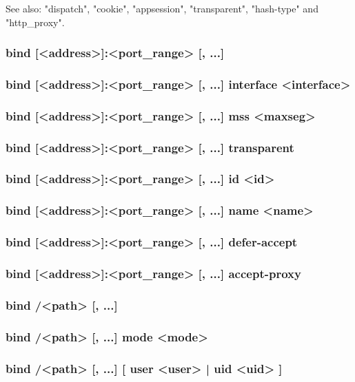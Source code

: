   See also: "dispatch", "cookie", "appsession", "transparent", "hash-type" and
             "http\_proxy".

\subsubsection[bind]{bind [<address>]:<port\_range> [, ...]}
\subsubsection*{bind [<address>]:<port\_range> [, ...] interface <interface>}
\subsubsection*{bind [<address>]:<port\_range> [, ...] mss <maxseg>}
\subsubsection*{bind [<address>]:<port\_range> [, ...] transparent}
\subsubsection*{bind [<address>]:<port\_range> [, ...] id <id>}
\subsubsection*{bind [<address>]:<port\_range> [, ...] name <name>}
\subsubsection*{bind [<address>]:<port\_range> [, ...] defer-accept}
\subsubsection*{bind [<address>]:<port\_range> [, ...] accept-proxy}
\subsubsection*{bind /<path> [, ...]}
\subsubsection*{bind /<path> [, ...] mode <mode>}
\subsubsection*{bind /<path> [, ...] [ user <user> | uid <uid> ]}
